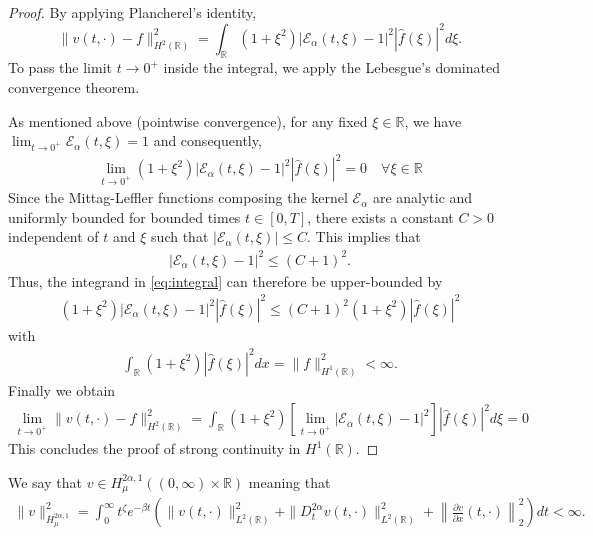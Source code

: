 \documentclass[10pt,a4paper]{article}
\numberwithin{equation}{section}
\theoremstyle{plain}
\theoremstyle{remark}
\begin{document}
\begin{proof}
By applying Plancherel's identity, 
\begin{equation}
\|v(t, \cdot) - f\|_{H^2(\mathbb{R})}^2 = \int_{\mathbb{R}} (1 + \xi^2) \left| \mathcal{E}_\alpha(t, \xi) - 1 \right|^2 | \hat{f}(\xi) |^2 d\xi.
\label{eq:integral}
\end{equation}
To pass the limit $t \to 0^+$ inside the integral, we apply the Lebesgue's dominated convergence theorem. 

As mentioned above (pointwise convergence),  for any fixed $\xi \in \mathbb{R}$, we have $\lim_{t \to 0^+} \mathcal{E}_\alpha(t, \xi) = 1$ and consequently,
\begin{align*}
\lim_{t \to 0^+} (1 + \xi^2) \left| \mathcal{E}_\alpha(t, \xi) - 1 \right|^2 | \hat{f}(\xi) |^2 = 0 \quad \forall \xi \in \mathbb{R}
\end{align*}
Since the Mittag-Leffler functions composing the kernel $\mathcal{E}_\alpha$ are analytic and uniformly bounded for bounded times $t \in [0, T]$, there exists a constant $C > 0$ independent of $t$ and $\xi$ such that $\left|\mathcal{E}_\alpha(t, \xi)\right| \le C$. This implies that
\begin{align*}
    \left| \mathcal{E}_\alpha(t, \xi) - 1 \right|^2 \le (C + 1)^2.
\end{align*}
Thus, the integrand in \eqref{eq:integral} can therefore be upper-bounded by
\begin{align*}
   (1 + \xi^2) \left| \mathcal{E}_\alpha(t, \xi) - 1 \right|^2 | \hat{f}(\xi) |^2 \le (C+1)^2 (1 + \xi^2) | \hat{f}(\xi) |^2
\end{align*}
with
\begin{align*}
\int_\mathbb{R} (1 + \xi^2) | \hat{f}(\xi) |^2 dx  = \| f\|^2_{H^1(\mathbb{R})} < \infty.
\end{align*}
Finally we obtain
\begin{align*}
\lim_{t \to 0^+} \|v(t, \cdot) - f\|_{H^2(\mathbb{R})}^2 = \int_{\mathbb{R}} (1 + \xi^2) \left[ \lim_{t \to 0^+} \left| \mathcal{E}_\alpha(t, \xi) - 1 \right|^2 \right] | \hat{f}(\xi) |^2 d\xi = 0
\end{align*}
This concludes the proof of strong continuity in $H^1(\mathbb{R})$.
\end{proof}

We say that $v \in H^{2\alpha, 1}_\mu((0, \infty) \times \mathbb{R})$ meaning that
\begin{align*}
\|v\|_{H^{2\alpha, 1}_\mu}^2 = \int_0^\infty t^\zeta e^{-\beta t} \left( \|v(t, \cdot)\|^2_{L^2(\mathbb{R})} + \|D^{2\alpha}_t v(t, \cdot)\|^2_{L^2(\mathbb{R})} + \left\|\frac{\partial v}{\partial x}(t, \cdot)\right\|_2^2 \right) dt < \infty.
\end{align*}
\end{document}
